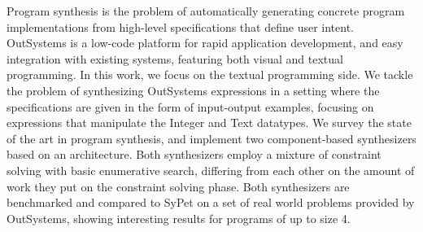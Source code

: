 Program synthesis is the problem of automatically generating concrete program
implementations from high-level specifications that define user intent.
OutSystems is a low-code platform for rapid application development,
and easy integration with existing systems, featuring both visual and
textual programming.
In this work, we focus on the textual programming side.
We tackle the problem of synthesizing OutSystems expressions in a setting where
the specifications are given in the form of input-output examples, focusing on
expressions that manipulate the Integer and Text datatypes.
We survey the state of the art in program synthesis, and implement two
component-based  synthesizers based on an 
architecture.
Both synthesizers employ a mixture of constraint solving with basic enumerative
search, differing from each other on the amount of work they put on the
constraint solving phase.
Both synthesizers are benchmarked and compared to SyPet on a set of real world
problems provided by OutSystems, showing interesting results for programs of up
to size 4.